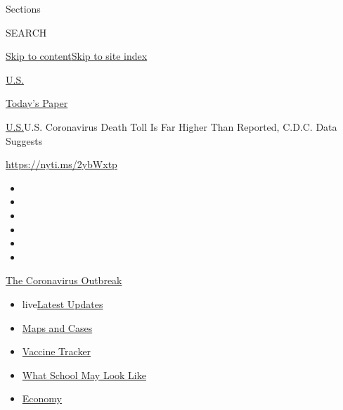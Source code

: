 Sections

SEARCH

\protect\hyperlink{site-content}{Skip to
content}\protect\hyperlink{site-index}{Skip to site index}

\href{https://www.nytimes.com/section/us}{U.S.}

\href{https://myaccount.nytimes.com/auth/login?response_type=cookie\&client_id=vi}{}

\href{https://www.nytimes.com/section/todayspaper}{Today's Paper}

\href{/section/us}{U.S.}\textbar{}U.S. Coronavirus Death Toll Is Far
Higher Than Reported, C.D.C. Data Suggests

\url{https://nyti.ms/2ybWxtp}

\begin{itemize}
\item
\item
\item
\item
\item
\item
\end{itemize}

\href{https://www.nytimes.com/news-event/coronavirus?action=click\&pgtype=Article\&state=default\&region=TOP_BANNER\&context=storylines_menu}{The
Coronavirus Outbreak}

\begin{itemize}
\tightlist
\item
  live\href{https://www.nytimes.com/2020/08/01/world/coronavirus-covid-19.html?action=click\&pgtype=Article\&state=default\&region=TOP_BANNER\&context=storylines_menu}{Latest
  Updates}
\item
  \href{https://www.nytimes.com/interactive/2020/us/coronavirus-us-cases.html?action=click\&pgtype=Article\&state=default\&region=TOP_BANNER\&context=storylines_menu}{Maps
  and Cases}
\item
  \href{https://www.nytimes.com/interactive/2020/science/coronavirus-vaccine-tracker.html?action=click\&pgtype=Article\&state=default\&region=TOP_BANNER\&context=storylines_menu}{Vaccine
  Tracker}
\item
  \href{https://www.nytimes.com/interactive/2020/07/29/us/schools-reopening-coronavirus.html?action=click\&pgtype=Article\&state=default\&region=TOP_BANNER\&context=storylines_menu}{What
  School May Look Like}
\item
  \href{https://www.nytimes.com/live/2020/07/31/business/stock-market-today-coronavirus?action=click\&pgtype=Article\&state=default\&region=TOP_BANNER\&context=storylines_menu}{Economy}
\end{itemize}

